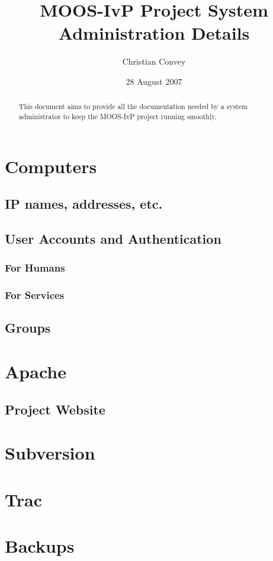 \documentclass[letterpaper,10pt]{article}
\title{MOOS-IvP Project System Administration Details}
\author{Christian Convey}
\date{28 August 2007}
\begin{document}
\maketitle

\begin{abstract}
This document aims to provide all the documentation needed by a system administrator to keep
the MOOS-IvP project running smoothly.
\end{abstract}


\tableofcontents

\section{Computers}
\subsection{IP names, addresses, etc.}
\subsection{User Accounts and Authentication}
\subsubsection{For Humans}
\subsubsection{For Services}
\subsection{Groups}

\section{Apache}
\subsection{Project Website}

\section{Subversion}

\section{Trac}

\section{Backups}
\end{document}
